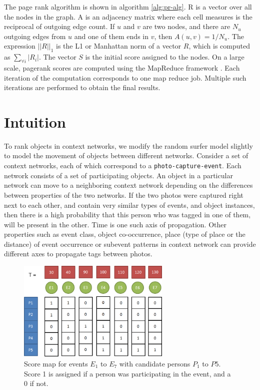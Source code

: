 The page rank algorithm is shown in algorithm \ref{alg:pr-alg}. R is a vector over all the nodes in the graph. A is an adjacency matrix where each cell measures is the reciprocal of outgoing edge count. If $u$ and $v$ are two nodes, and there are $N_u$ outgoing edges from $u$ and one of them ends in $v$, then $A(u, v) = 1/N_u$. The expression $||R||_1$ is the L1 or Manhattan norm of a vector $R$, which is computed as $\sum_{\forall i} |R_i|$. The vector $S$ is the initial score assigned to the nodes. On a large scale, pagerank scores are computed using the MapReduce framework \cite{dean2008mapreduce}. Each iteration of the computation corresponds to one map reduce job. Multiple such iterations are performed to obtain the final results.

\section{Intuition}

To rank objects in context networks, we modify the random surfer model slightly to model the movement of objects between different networks. Consider a set of context networks, each of which correspond to a \texttt{photo-capture-event}. Each network consists of a set of participating objects. An object in a particular network can move to a neighboring context network depending on the differences between properties of the two networks. If the two photos were captured right next to each other, and contain very similar types of events, and object instances, then there is a high probability that this person who was tagged in one of them, will be present in the other. Time is one such axis of propagation. Other properties such as event class, object co-occurrence, place (type of place or the distance) of event occurrence or subevent patterns in context network can provide different axes to propagate tags between photos.

\begin{figure}[t]
\centering
\includegraphics[width=0.65\textwidth]{media/chapter6/time-example-2.png}
\caption{Score map for events $E_1$ to $E_7$ with candidate persons $P_1$ to $P5$. Score 1 is assigned if a person was participating in the event, and a 0 if not.}
\label{fig:time-example}
\end{figure}

